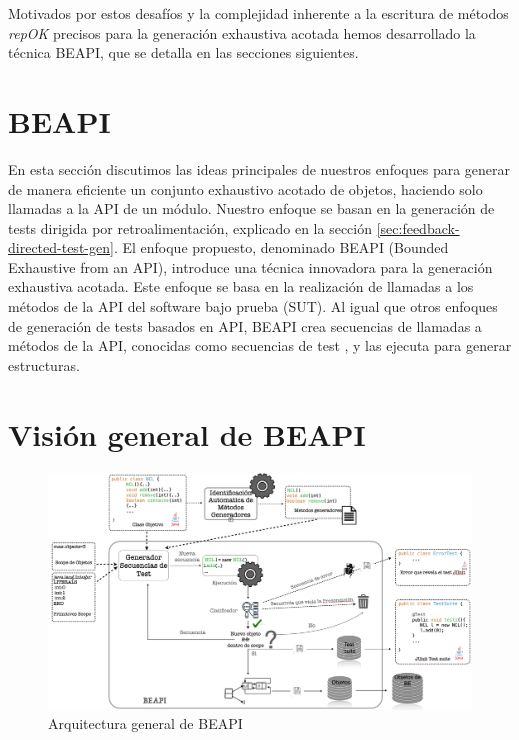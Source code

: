 Motivados por estos desafíos y la complejidad inherente a la escritura de
métodos \emph{repOK} precisos para la generación exhaustiva acotada hemos
desarrollado la técnica BEAPI, que se detalla en las secciones siguientes.

\section[BEAPI]{BEAPI}
\label{sec:beapiIntro}
En esta sección discutimos las ideas principales de nuestros enfoques para generar de manera eficiente un conjunto exhaustivo acotado de objetos, haciendo solo llamadas a la API de un módulo. Nuestro enfoque se basan en la generación de tests dirigida por retroalimentación, explicado en la sección \ref{sec:feedback-directed-test-gen}.
El enfoque propuesto, denominado \textsf{BEAPI} (Bounded Exhaustive from an API), introduce una técnica innovadora para la generación exhaustiva acotada. Este enfoque se basa en la realización de llamadas a los métodos de la API del software bajo prueba (SUT). Al igual que otros enfoques de generación de tests basados en API, \textsf{BEAPI} crea secuencias de llamadas a métodos de la API, conocidas como secuencias de test \cite{Ammann16}, y las ejecuta para generar estructuras. 

\section{Visión general de BEAPI}
\label{sec:beapi-overview}

\begin{figure}[H]
  \centering
  \includegraphics[width=1.0\textwidth]{images/beapi-arquitecture.jpeg}
  \caption{Arquitectura general de \textsf{BEAPI}}
  \label{fig:beapi-overview}
\end{figure}


